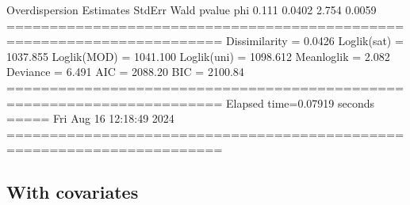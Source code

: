 \documentclass[letterpaper,10pt,english]{sphinxmanual}
\begin{document}
\begin{sphinxVerbatim}[commandchars=\\\{\}]
Overdispersion
     Estimates  StdErr    Wald  p\PYGZhy{}value
phi      0.111  0.0402   2.754   0.0059
=======================================================================
Dissimilarity = 0.0426
Loglik(sat)   = \PYGZhy{}1037.855
Loglik(MOD)   = \PYGZhy{}1041.100
Loglik(uni)   = \PYGZhy{}1098.612
Mean\PYGZhy{}loglik   = \PYGZhy{}2.082
Deviance      = 6.491
\PYGZhy{}\PYGZhy{}\PYGZhy{}\PYGZhy{}\PYGZhy{}\PYGZhy{}\PYGZhy{}\PYGZhy{}\PYGZhy{}\PYGZhy{}\PYGZhy{}\PYGZhy{}\PYGZhy{}\PYGZhy{}\PYGZhy{}\PYGZhy{}\PYGZhy{}\PYGZhy{}\PYGZhy{}\PYGZhy{}\PYGZhy{}\PYGZhy{}\PYGZhy{}\PYGZhy{}\PYGZhy{}\PYGZhy{}\PYGZhy{}\PYGZhy{}\PYGZhy{}\PYGZhy{}\PYGZhy{}\PYGZhy{}\PYGZhy{}\PYGZhy{}\PYGZhy{}\PYGZhy{}\PYGZhy{}\PYGZhy{}\PYGZhy{}\PYGZhy{}\PYGZhy{}\PYGZhy{}\PYGZhy{}\PYGZhy{}\PYGZhy{}\PYGZhy{}\PYGZhy{}\PYGZhy{}\PYGZhy{}\PYGZhy{}\PYGZhy{}\PYGZhy{}\PYGZhy{}\PYGZhy{}\PYGZhy{}\PYGZhy{}\PYGZhy{}\PYGZhy{}\PYGZhy{}\PYGZhy{}\PYGZhy{}\PYGZhy{}\PYGZhy{}\PYGZhy{}\PYGZhy{}\PYGZhy{}\PYGZhy{}\PYGZhy{}\PYGZhy{}\PYGZhy{}\PYGZhy{}
AIC = 2088.20
BIC = 2100.84
=======================================================================
Elapsed time=0.07919 seconds =====\PYGZgt{}\PYGZgt{}\PYGZgt{} Fri Aug 16 12:18:49 2024
=======================================================================
\end{sphinxVerbatim}

\noindent{}


\subsection{With covariates}
\label{\detokenize{manual:cube-with-covariates}}\label{\detokenize{manual:id32}}
\sphinxAtStartPar
{}
\end{document}
